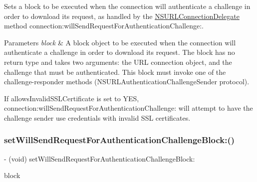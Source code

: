 Sets a block to be executed when the connection will authenticate a challenge in order to download its request, as handled by the {\ttfamily \mbox{\hyperlink{class_n_s_u_r_l_connection_delegate-p}{N\+S\+U\+R\+L\+Connection\+Delegate}}} method {\ttfamily connection\+:will\+Send\+Request\+For\+Authentication\+Challenge\+:}.


\begin{DoxyParams}{Parameters}
{\em block} & A block object to be executed when the connection will authenticate a challenge in order to download its request. The block has no return type and takes two arguments\+: the U\+RL connection object, and the challenge that must be authenticated. This block must invoke one of the challenge-\/responder methods (N\+S\+U\+R\+L\+Authentication\+Challenge\+Sender protocol).\\
\hline
\end{DoxyParams}
If {\ttfamily allows\+Invalid\+S\+S\+L\+Certificate} is set to Y\+ES, {\ttfamily connection\+:will\+Send\+Request\+For\+Authentication\+Challenge\+:} will attempt to have the challenge sender use credentials with invalid S\+SL certificates. \mbox{\label{interface_a_f_u_r_l_connection_operation_a1b3cba1bf8db5763863c288ed04e4f31}} 
\subsubsection{\texorpdfstring{set\+Will\+Send\+Request\+For\+Authentication\+Challenge\+Block\+:()}{setWillSendRequestForAuthenticationChallengeBlock:()}\hspace{0.1cm}{\footnotesize\ttfamily [3/3]}}
{\footnotesize\ttfamily -\/ (void) set\+Will\+Send\+Request\+For\+Authentication\+Challenge\+Block\+: \begin{DoxyParamCaption}\item[{(nullable void($^\wedge$)(N\+S\+U\+R\+L\+Connection $\ast$connection, N\+S\+U\+R\+L\+Authentication\+Challenge $\ast$challenge))}]{block }\end{DoxyParamCaption}}

